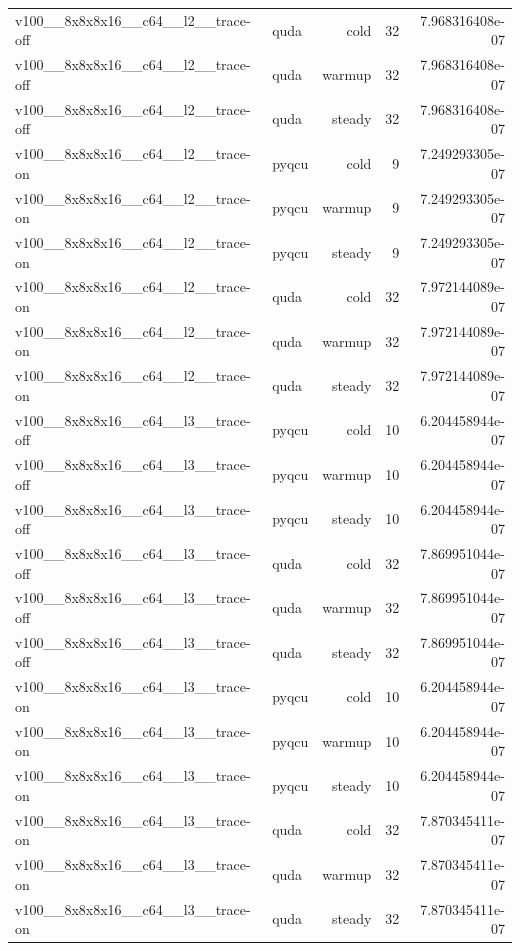 \begin{table}[htbp]
\begin{tabular}{@{}llrrr@{}}
v100\_\_8x8x8x16\_\_c64\_\_l2\_\_trace-off & quda & cold & 32 & 7.968316408e-07 \\
v100\_\_8x8x8x16\_\_c64\_\_l2\_\_trace-off & quda & warmup & 32 & 7.968316408e-07 \\
v100\_\_8x8x8x16\_\_c64\_\_l2\_\_trace-off & quda & steady & 32 & 7.968316408e-07 \\
v100\_\_8x8x8x16\_\_c64\_\_l2\_\_trace-on & pyqcu & cold & 9 & 7.249293305e-07 \\
v100\_\_8x8x8x16\_\_c64\_\_l2\_\_trace-on & pyqcu & warmup & 9 & 7.249293305e-07 \\
v100\_\_8x8x8x16\_\_c64\_\_l2\_\_trace-on & pyqcu & steady & 9 & 7.249293305e-07 \\
v100\_\_8x8x8x16\_\_c64\_\_l2\_\_trace-on & quda & cold & 32 & 7.972144089e-07 \\
v100\_\_8x8x8x16\_\_c64\_\_l2\_\_trace-on & quda & warmup & 32 & 7.972144089e-07 \\
v100\_\_8x8x8x16\_\_c64\_\_l2\_\_trace-on & quda & steady & 32 & 7.972144089e-07 \\
v100\_\_8x8x8x16\_\_c64\_\_l3\_\_trace-off & pyqcu & cold & 10 & 6.204458944e-07 \\
v100\_\_8x8x8x16\_\_c64\_\_l3\_\_trace-off & pyqcu & warmup & 10 & 6.204458944e-07 \\
v100\_\_8x8x8x16\_\_c64\_\_l3\_\_trace-off & pyqcu & steady & 10 & 6.204458944e-07 \\
v100\_\_8x8x8x16\_\_c64\_\_l3\_\_trace-off & quda & cold & 32 & 7.869951044e-07 \\
v100\_\_8x8x8x16\_\_c64\_\_l3\_\_trace-off & quda & warmup & 32 & 7.869951044e-07 \\
v100\_\_8x8x8x16\_\_c64\_\_l3\_\_trace-off & quda & steady & 32 & 7.869951044e-07 \\
v100\_\_8x8x8x16\_\_c64\_\_l3\_\_trace-on & pyqcu & cold & 10 & 6.204458944e-07 \\
v100\_\_8x8x8x16\_\_c64\_\_l3\_\_trace-on & pyqcu & warmup & 10 & 6.204458944e-07 \\
v100\_\_8x8x8x16\_\_c64\_\_l3\_\_trace-on & pyqcu & steady & 10 & 6.204458944e-07 \\
v100\_\_8x8x8x16\_\_c64\_\_l3\_\_trace-on & quda & cold & 32 & 7.870345411e-07 \\
v100\_\_8x8x8x16\_\_c64\_\_l3\_\_trace-on & quda & warmup & 32 & 7.870345411e-07 \\
v100\_\_8x8x8x16\_\_c64\_\_l3\_\_trace-on & quda & steady & 32 & 7.870345411e-07 \\
\bottomrule
\end{tabular}
\end{table}

